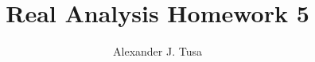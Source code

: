 \documentclass[12pt,letterpaper]{article}
\author{Alexander J. Tusa}
\title{Real Analysis Homework 5}
\theoremstyle{case}
\theoremstyle{definition}
\begin{document}
	\maketitle
	\begin{enumerate}
	
	\end{enumerate}
\end{document}
